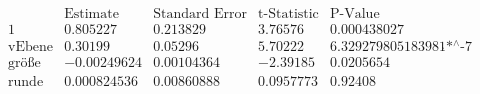 \[\begin{array}{l|llll}
 \text{} & \text{Estimate} & \text{Standard Error} & \text{t-Statistic} & \text{P-Value} \\
\hline
 1 & 0.805227 & 0.213829 & 3.76576 & 0.000438027 \\
 \text{vEbene} & 0.30199 & 0.05296 & 5.70222 & \text{6.329279805183981$\grave{ }$*${}^{\wedge}$-7} \\
 \text{gr{\" o}{\ss}e} & -0.00249624 & 0.00104364 & -2.39185 & 0.0205654 \\
 \text{runde} & 0.000824536 & 0.00860888 & 0.0957773 & 0.92408 \\
\end{array}\]

